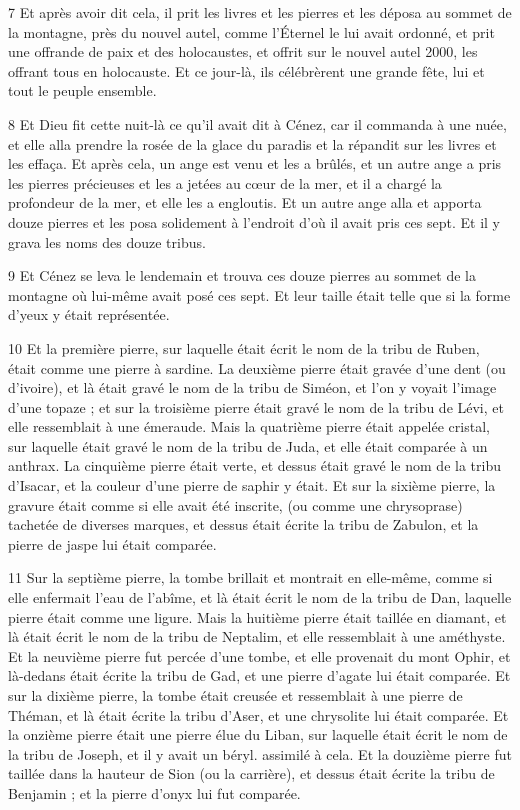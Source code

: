 \par 7 Et après avoir dit cela, il prit les livres et les pierres et les déposa au sommet de la montagne, près du nouvel autel, comme l'Éternel le lui avait ordonné, et prit une offrande de paix et des holocaustes, et offrit sur le nouvel autel 2000, les offrant tous en holocauste. Et ce jour-là, ils célébrèrent une grande fête, lui et tout le peuple ensemble.

\par 8 Et Dieu fit cette nuit-là ce qu'il avait dit à Cénez, car il commanda à une nuée, et elle alla prendre la rosée de la glace du paradis et la répandit sur les livres et les effaça. Et après cela, un ange est venu et les a brûlés, et un autre ange a pris les pierres précieuses et les a jetées au cœur de la mer, et il a chargé la profondeur de la mer, et elle les a engloutis. Et un autre ange alla et apporta douze pierres et les posa solidement à l'endroit d'où il avait pris ces sept. Et il y grava les noms des douze tribus.

\par 9 Et Cénez se leva le lendemain et trouva ces douze pierres au sommet de la montagne où lui-même avait posé ces sept. Et leur taille était telle que si la forme d'yeux y était représentée.

\par 10 Et la première pierre, sur laquelle était écrit le nom de la tribu de Ruben, était comme une pierre à sardine. La deuxième pierre était gravée d'une dent (ou d'ivoire), et là était gravé le nom de la tribu de Siméon, et l'on y voyait l'image d'une topaze ; et sur la troisième pierre était gravé le nom de la tribu de Lévi, et elle ressemblait à une émeraude. Mais la quatrième pierre était appelée cristal, sur laquelle était gravé le nom de la tribu de Juda, et elle était comparée à un anthrax. La cinquième pierre était verte, et dessus était gravé le nom de la tribu d'Isacar, et la couleur d'une pierre de saphir y était. Et sur la sixième pierre, la gravure était comme si elle avait été inscrite, (ou comme une chrysoprase) tachetée de diverses marques, et dessus était écrite la tribu de Zabulon, et la pierre de jaspe lui était comparée.

\par 11 Sur la septième pierre, la tombe brillait et montrait en elle-même, comme si elle enfermait l'eau de l'abîme, et là était écrit le nom de la tribu de Dan, laquelle pierre était comme une ligure. Mais la huitième pierre était taillée en diamant, et là était écrit le nom de la tribu de Neptalim, et elle ressemblait à une améthyste. Et la neuvième pierre fut percée d'une tombe, et elle provenait du mont Ophir, et là-dedans était écrite la tribu de Gad, et une pierre d'agate lui était comparée. Et sur la dixième pierre, la tombe était creusée et ressemblait à une pierre de Théman, et là était écrite la tribu d'Aser, et une chrysolite lui était comparée. Et la onzième pierre était une pierre élue du Liban, sur laquelle était écrit le nom de la tribu de Joseph, et il y avait un béryl. assimilé à cela. Et la douzième pierre fut taillée dans la hauteur de Sion (ou la carrière), et dessus était écrite la tribu de Benjamin ; et la pierre d'onyx lui fut comparée.

